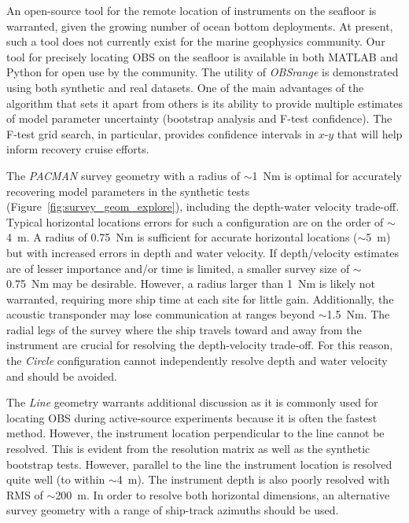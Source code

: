 An open-source tool for the remote location of instruments on the seafloor is warranted, given the growing number of ocean bottom deployments. At present, such a tool does not currently exist for the marine geophysics community. Our tool for precisely locating OBS on the seafloor is available in both MATLAB and Python for open use by the community. The utility of \textit{OBSrange} is demonstrated using both synthetic and real datasets. One of the main advantages of the algorithm that sets it apart from others is its ability to provide multiple estimates of model parameter uncertainty (bootstrap analysis and F-test confidence). The F-test grid search, in particular, provides confidence intervals in $x$-$y$ that will help inform recovery cruise efforts.

The \textit{PACMAN} survey geometry with a radius of $\sim$1~Nm is optimal for accurately recovering model parameters in the synthetic tests (Figure~\ref{fig:survey_geom_explore}), including the depth-water velocity trade-off. Typical horizontal locations errors for such a configuration are on the order of $\sim$4~m. A radius of 0.75~Nm is sufficient for accurate horizontal locations ($\sim$5~m) but with increased errors in depth and water velocity. If depth/velocity estimates are of lesser importance and/or time is limited, a smaller survey size of $\sim$0.75~Nm may be desirable. However, a radius larger than 1~Nm is likely not warranted, requiring more ship time at each site for little gain. Additionally, the acoustic transponder may lose communication at ranges beyond $\sim$1.5~Nm. The radial legs of the survey where the ship travels toward and away from the instrument are crucial for resolving the depth-velocity trade-off. For this reason, the \textit{Circle} configuration cannot independently resolve depth and water velocity and should be avoided.

The \textit{Line} geometry warrants additional discussion as it is commonly used for locating OBS during active-source experiments because it is often the fastest method. However, the instrument location perpendicular to the line cannot be resolved. This is evident from the resolution matrix as well as the synthetic bootstrap tests. However, parallel to the line the instrument location is resolved quite well (to within $\sim$4~m). The instrument depth is also poorly resolved with RMS of $\sim$200~m. In order to resolve both horizontal dimensions, an alternative survey geometry with a range of ship-track azimuths should be used.

